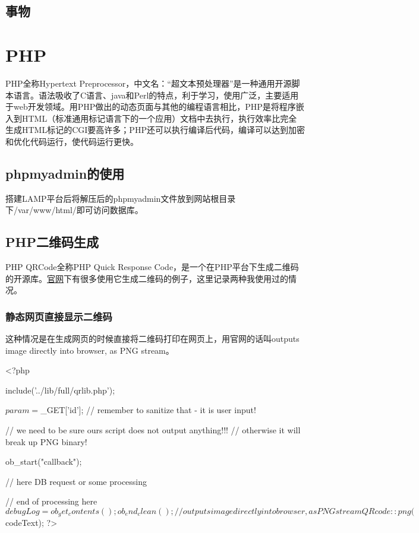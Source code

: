 \subsection{事物}

\section{PHP}
PHP全称Hypertext Preprocessor，中文名：“超文本预处理器”是一种通用开源脚本语言。语法吸收了C语言、java和Perl的特点，利于学习，使用广泛，主要适用于web开发领域。用PHP做出的动态页面与其他的编程语言相比，PHP是将程序嵌入到HTML（标准通用标记语言下的一个应用）文档中去执行，执行效率比完全生成HTML标记的CGI要高许多；PHP还可以执行编译后代码，编译可以达到加密和优化代码运行，使代码运行更快。
\subsection{phpmyadmin的使用}
搭建LAMP平台后将解压后的phpmyadmin文件放到网站根目录下/var/www/html/即可访问数据库。
\subsection{PHP二维码生成}
PHP QRCode全称PHP Quick Response Code，是一个在PHP平台下生成二维码的开源库。\href{https://phpqrcode.sourceforge.net/}{官网}下有很多使用它生成二维码的例子，这里记录两种我使用过的情况。
\subsubsection{静态网页直接显示二维码}
这种情况是在生成网页的时候直接将二维码打印在网页上，用官网的话叫outputs image directly into browser, as PNG stream。
\begin{shell}
 <?php

    include('../lib/full/qrlib.php');
        
    $param = $_GET['id']; // remember to sanitize that - it is user input!
    
    // we need to be sure ours script does not output anything!!!
    // otherwise it will break up PNG binary!
    
    ob_start("callback");
    
    // here DB request or some processing
    
    // end of processing here
    $debugLog = ob_get_contents();
    ob_end_clean();
    
    // outputs image directly into browser, as PNG stream
    QRcode::png($codeText); 
?>
\end{shell}
